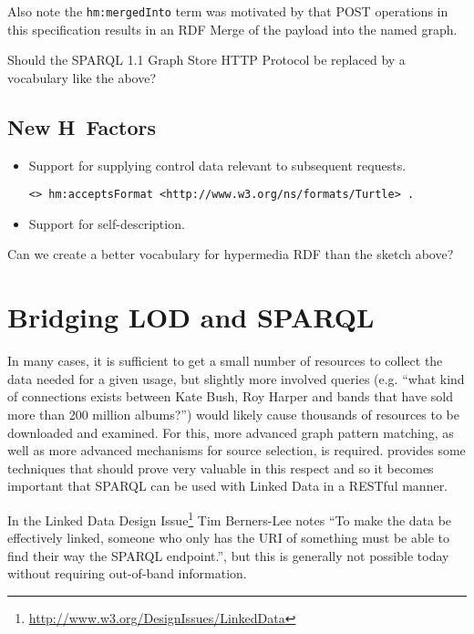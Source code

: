 \documentclass{llncs}
\begin{document}
Also note the \texttt{hm:mergedInto} term was motivated by that POST
operations in this specification results in an RDF Merge of the
payload into the named graph. 

\begin{question}
Should the SPARQL 1.1 Graph Store HTTP Protocol be replaced by a
vocabulary like the above?
\end{question}

\subsection{New H~Factors}

\begin{itemize}
\item Support for supplying control data relevant to subsequent requests.


\begin{verbatim}
<> hm:acceptsFormat <http://www.w3.org/ns/formats/Turtle> .
\end{verbatim}

\item Support for self-description.

\end{itemize}


\begin{question}
Can we create a better vocabulary for hypermedia RDF than the sketch above?
\end{question}


\section{Bridging LOD and SPARQL}

In many cases, it is sufficient to get a small number of resources to
collect the data needed for a given usage, but slightly more involved
queries (e.g. ``what kind of connections exists between Kate Bush, Roy
Harper and bands that have sold more than 200 million albums?'') would
likely cause thousands of resources to be downloaded and examined. For
this, more advanced graph pattern matching, as well as more advanced
mechanisms for source selection, is
required. \cite{springerlink:10.1007/978-3-642-25073-6-38} provides
some techniques that should prove very valuable in this respect and so
it becomes important that SPARQL can be used with Linked Data in a
RESTful manner.

In the Linked Data Design
Issue\footnote{\url{http://www.w3.org/DesignIssues/LinkedData}} Tim
Berners-Lee notes ``To make the data be effectively linked, someone
who only has the URI of something must be able to find their way the
SPARQL endpoint.'', but this is generally not possible today without
requiring out-of-band information.
\end{document}
